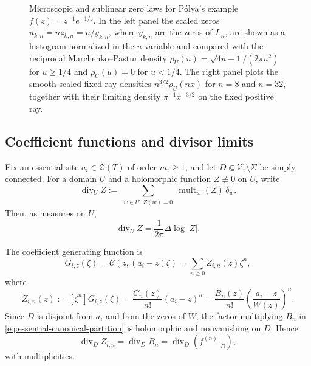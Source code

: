 \documentclass[reqno]{article}
\theoremstyle{definition}
\theoremstyle{remark}
\theoremstyle{plain}
\newcommand{\Z}{\mathcal Z}
\begin{document}
\begin{figure}[t]
\caption{Microscopic and sublinear zero laws for P\'olya's example $f(z)=z^{-1}e^{-1/z}$. In the left panel the scaled zeros $u_{k,n}=nz_{k,n}=n/y_{k,n}$, where $y_{k,n}$ are the zeros of $L_n$, are shown as a histogram normalized in the $u$-variable and compared with the reciprocal Marchenko--Pastur density $\rho_U(u)=\sqrt{4u-1}/(2\pi u^2)$ for $u\ge1/4$ and $\rho_U(u)=0$ for $u<1/4$. The right panel plots the smooth scaled fixed-ray densities $n^{3/2}\rho_U(nx)$ for $n=8$ and $n=32$, together with their limiting density $\pi^{-1}x^{-3/2}$ on the fixed positive ray.}
\label{fig:laguerre-microscopic-sublinear}
\end{figure}

\subsection{Coefficient functions and divisor limits}\label{subsec:essential-partition}

Fix an essential site $a_i\in\Z(T)$ of order $m_i\ge1$, and let $D\Subset\mathcal V_i^\circ\setminus\Sigma$ be simply connected. For a domain $U$ and a holomorphic function $Z\not\equiv0$ on $U$, write
\[
\operatorname{div}_U Z:=
\sum_{\substack{w\in U:\,Z(w)=0}}
\operatorname{mult}_w(Z)\,\delta_w .
\]
Then, as measures on $U$,
\[
\operatorname{div}_U Z=\frac{1}{2\pi}\Delta\log|Z|.
\]

The coefficient generating function is
\[
G_{i,z}(\zeta)=\mathcal C(z,(a_i-z)\zeta)
=\sum_{n\ge0}Z_{i,n}(z)\zeta^n,
\]
where
\begin{equation}\label{eq:essential-canonical-partition}
Z_{i,n}(z):=[\zeta^n]G_{i,z}(\zeta)
=\frac{C_n(z)}{n!}(a_i-z)^n
=\frac{B_n(z)}{n!}\left(\frac{a_i-z}{W(z)}\right)^n .
\end{equation}
Since $D$ is disjoint from $a_i$ and from the zeros of $W$, the factor multiplying $B_n$ in \eqref{eq:essential-canonical-partition} is holomorphic and nonvanishing on $D$. Hence
\[
\operatorname{div}_D Z_{i,n}=\operatorname{div}_D B_n=\operatorname{div}_D(f^{(n)}|_D),
\]
with multiplicities.
\end{document}

